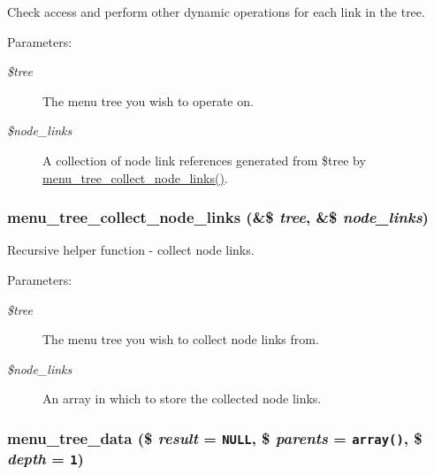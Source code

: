 Check access and perform other dynamic operations for each link in the tree.

\begin{Desc}
\item[Parameters:]
\begin{description}
\item[{\em \$tree}]The menu tree you wish to operate on. \item[{\em \$node\_\-links}]A collection of node link references generated from \$tree by \hyperlink{group__menu_g0c9a63fbbdf8496828f1f80d37459475}{menu\_\-tree\_\-collect\_\-node\_\-links()}. \end{description}
\end{Desc}
\hypertarget{group__menu_g0c9a63fbbdf8496828f1f80d37459475}{
\subsubsection[{menu\_\-tree\_\-collect\_\-node\_\-links}]{\setlength{\rightskip}{0pt plus 5cm}menu\_\-tree\_\-collect\_\-node\_\-links (\&\$ {\em tree}, \/  \&\$ {\em node\_\-links})}}
\label{group__menu_g0c9a63fbbdf8496828f1f80d37459475}


Recursive helper function - collect node links.

\begin{Desc}
\item[Parameters:]
\begin{description}
\item[{\em \$tree}]The menu tree you wish to collect node links from. \item[{\em \$node\_\-links}]An array in which to store the collected node links. \end{description}
\end{Desc}
\hypertarget{group__menu_gbf77de9e90a7f2c4f889a74cde1ee3e4}{
\subsubsection[{menu\_\-tree\_\-data}]{\setlength{\rightskip}{0pt plus 5cm}menu\_\-tree\_\-data (\$ {\em result} = {\tt NULL}, \/  \$ {\em parents} = {\tt array()}, \/  \$ {\em depth} = {\tt 1})}}
\label{group__menu_gbf77de9e90a7f2c4f889a74cde1ee3e4}


